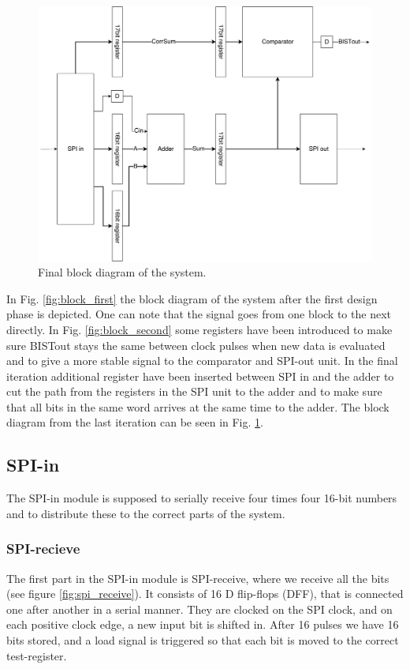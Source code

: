 \begin{figure}[H]
\centering
\captionsetup{justification=centering}
\includegraphics[scale=0.1]{../figures/top_level_final.png}
\caption{Final block diagram of the system.}  \label{fig:block_final}
\end{figure}

In Fig. \ref{fig:block_first} the block diagram of the system after the first design phase is depicted. One can note that the signal goes from one block to the next directly. In Fig. \ref{fig:block_second} some registers have been introduced to make sure BISTout stays the same between clock pulses when new data is evaluated and to give a more stable signal to the comparator and SPI-out unit. In the final iteration additional register have been inserted between SPI in and the adder to cut the path from the registers in the SPI unit to the adder and to make sure that all bits in the same word arrives at the same time to the adder. The block diagram from the last iteration can be seen in Fig. \ref{fig:block_final}.

\subsection{SPI-in}
The SPI-in module is supposed to serially receive four times four 16-bit numbers and to distribute these to the correct parts of the system. 

\subsubsection{SPI-recieve}
The first part in the SPI-in module is SPI-receive, where we receive all the bits (see figure \ref{fig:spi_receive}). It consists of 16 D flip-flops (DFF), that is connected one after another in a serial manner. They are clocked on the SPI clock, and on each positive clock edge, a new input bit is shifted in. After 16 pulses we have 16 bits stored, and a load signal is triggered so that each bit is moved to the correct test-register.

